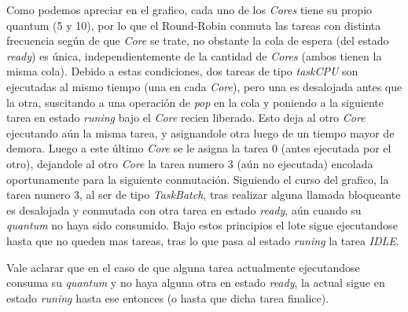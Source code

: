 Como podemos apreciar en el grafico, cada uno de los \textit{Cores} tiene su propio quantum (5 y 10), por lo que el Round-Robin conmuta las tareas con distinta frecuencia según de que \textit{Core} se trate, no obstante la cola de espera (del estado \textit{ready}) es única, independientemente de la cantidad de \textit{Cores} (ambos tienen la misma cola). Debido a estas condiciones, dos tareas de tipo \textit{taskCPU} son ejecutadas al mismo tiempo (una en cada \textit{Core}), pero una es desalojada antes que la otra, suscitando a una operación de \textit{pop} en la cola y poniendo a la siguiente tarea en estado \textit{runing} bajo el \textit{Core} recien liberado. Esto deja al otro \textit{Core} ejecutando aún la misma tarea, y asignandole otra luego de un tiempo mayor de demora. Luego a este último \textit{Core} se le asigna la tarea 0 (antes ejecutada por el otro), dejandole al otro \textit{Core} la tarea numero 3 (aún no ejecutada) encolada oportunamente para la siguiente conmutación. Siguiendo el curso del grafico, la tarea numero 3, al ser de tipo \textit{TaskBatch}, tras realizar alguna llamada bloqueante es desalojada y conmutada con otra tarea en estado \textit{ready}, aún cuando su \textit{quantum} no haya sido consumido. Bajo estos principios el lote sigue ejecutandose hasta que no queden mas tareas, tras lo que pasa al estado \textit{runing} la tarea \textit{IDLE}.

Vale aclarar que en el caso de que alguna tarea actualmente ejecutandose consuma su \textit{quantum} y no haya alguna otra en estado \textit{ready}, la actual sigue en estado \textit{runing} hasta ese entonces (o hasta que dicha tarea finalice). 



